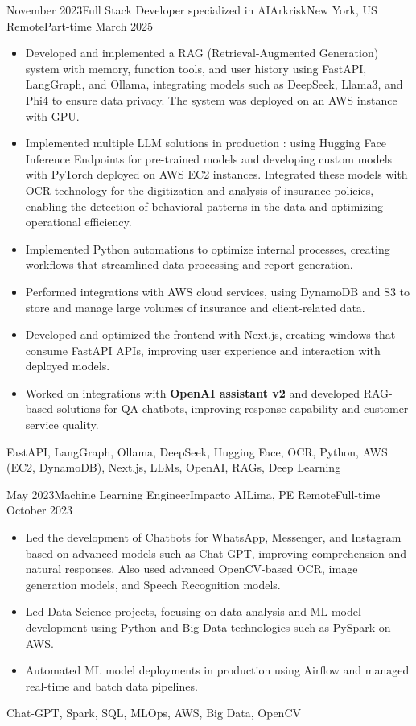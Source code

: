 \begin{experiences}
\emptySeparator
\experience
  {November 2023}{Full Stack Developer specialized in AI}{Arkrisk}{New York, US}
  {Remote}{Part-time}
  {March 2025} {
    \begin{itemize}
      \item Developed and implemented a RAG (Retrieval-Augmented Generation) system with memory, function tools, and user history using FastAPI, LangGraph, and Ollama, integrating models such as DeepSeek, Llama3, and Phi4 to ensure data privacy. The system was deployed on an AWS instance with GPU.
      \item Implemented multiple LLM solutions in production : using Hugging Face Inference Endpoints for pre-trained models and developing custom models with PyTorch deployed on AWS EC2 instances. Integrated these models with OCR technology for the digitization and analysis of insurance policies, enabling the detection of behavioral patterns in the data and optimizing operational efficiency.
      \item Implemented Python automations to optimize internal processes, creating workflows that streamlined data processing and report generation.
      \item Performed integrations with AWS cloud services, using DynamoDB and S3 to store and manage large volumes of insurance and client-related data.
      \item Developed and optimized the frontend with Next.js, creating windows that consume FastAPI APIs, improving user experience and interaction with deployed models.
      \item Worked on integrations with \textbf{OpenAI assistant v2} and developed RAG-based solutions for QA chatbots, improving response capability and customer service quality.
    \end{itemize}
  }
  {FastAPI, LangGraph, Ollama, DeepSeek, Hugging Face, OCR, Python, {AWS (EC2, DynamoDB)}, Next.js, LLMs, OpenAI, RAGs, Deep Learning}

\emptySeparator
\experience
  {May 2023}{Machine Learning Engineer}{Impacto AI}{Lima, PE}
  {Remote}{Full-time}
  {October 2023} {
    \begin{itemize}
      \item Led the development of Chatbots for WhatsApp, Messenger, and Instagram based on advanced models such as Chat-GPT, improving comprehension and natural responses. Also used advanced OpenCV-based OCR, image generation models, and Speech Recognition models.
      \item Led Data Science projects, focusing on data analysis and ML model development using Python and Big Data technologies such as PySpark on AWS.
      \item Automated ML model deployments in production using Airflow and managed real-time and batch data pipelines.
    \end{itemize}
  }
  {Chat-GPT, Spark, SQL, MLOps, AWS, Big Data, OpenCV}


\end{experiences}
